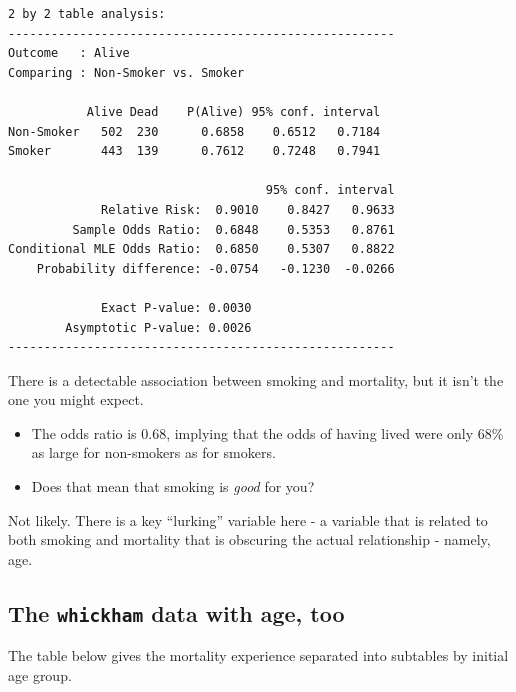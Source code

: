 \documentclass[
]{book}
\providecommand{\tightlist}{%
  \setlength{\itemsep}{0pt}\setlength{\parskip}{0pt}}
\begin{document}
\begin{verbatim}
2 by 2 table analysis: 
------------------------------------------------------ 
Outcome   : Alive 
Comparing : Non-Smoker vs. Smoker 

           Alive Dead    P(Alive) 95% conf. interval
Non-Smoker   502  230      0.6858    0.6512   0.7184
Smoker       443  139      0.7612    0.7248   0.7941

                                    95% conf. interval
             Relative Risk:  0.9010    0.8427   0.9633
         Sample Odds Ratio:  0.6848    0.5353   0.8761
Conditional MLE Odds Ratio:  0.6850    0.5307   0.8822
    Probability difference: -0.0754   -0.1230  -0.0266

             Exact P-value: 0.0030 
        Asymptotic P-value: 0.0026 
------------------------------------------------------
\end{verbatim}

There is a detectable association between smoking and mortality, but it isn't the one you might expect.

\begin{itemize}
\tightlist
\item
  The odds ratio is 0.68, implying that the odds of having lived were only 68\% as large for non-smokers as for smokers.
\item
  Does that mean that smoking is \emph{good} for you?
\end{itemize}

Not likely. There is a key ``lurking'' variable here - a variable that is related to both smoking and mortality that is obscuring the actual relationship - namely, age.

\hypertarget{the-whickham-data-with-age-too}{%
\subsection{\texorpdfstring{The \texttt{whickham} data with age, too}{The whickham data with age, too}}\label{the-whickham-data-with-age-too}}

The table below gives the mortality experience separated into subtables by initial age group.
\end{document}
